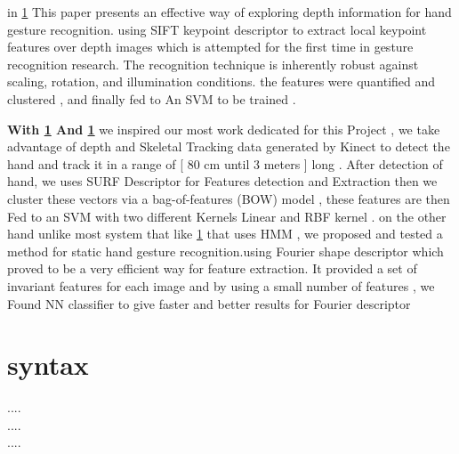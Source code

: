 in \ref{} This paper presents an effective way of exploring depth information for hand gesture recognition. using  SIFT keypoint descriptor to extract local keypoint features
over depth images which is attempted for the first time in gesture recognition research. The recognition technique is inherently robust against scaling, rotation, and illumination conditions.  the features were  quantified  and clustered , and finally fed to  An SVM to be trained .

\textbf{With \ref{} And \ref{} } we inspired our most work dedicated for this Project , we take advantage of  depth and Skeletal Tracking  data generated by Kinect to detect the hand and track it  in a range of [ 80 cm until 3 meters ] long  .
After detection of hand, we uses SURF Descriptor for Features detection and Extraction then we  cluster these vectors via a bag-of-features (BOW) model , these features are then Fed to an SVM with two different Kernels Linear and RBF kernel .
on the other hand unlike most system that like \ref{} that uses HMM ,  we proposed and tested a method for static hand gesture recognition.using  Fourier shape  descriptor which proved to be a very efficient way for feature extraction. It provided a set of invariant features for each image and by using a small number of features , we Found NN classifier to give faster and better results for Fourier descriptor 


\section{syntax}

....
\\
....
\\
....

